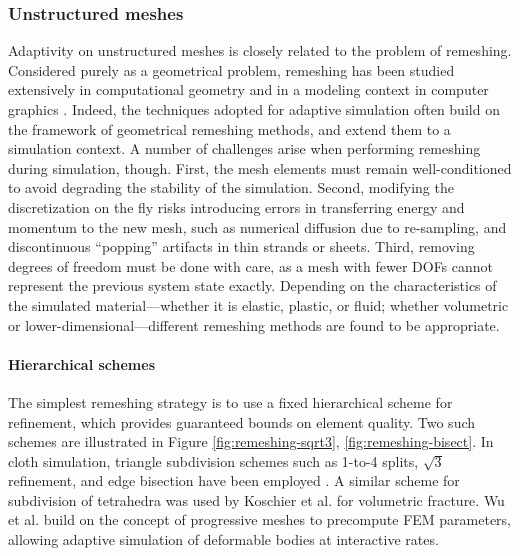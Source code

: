 \subsubsection{Unstructured meshes}
\label{sec:meshes}


Adaptivity on unstructured meshes is closely related to the problem of remeshing.
Considered purely as a geometrical problem, remeshing has been studied extensively in computational geometry \cite{Cheng2012} and in a modeling context in computer graphics \cite{Alliez2008}.
Indeed, the techniques adopted for adaptive simulation often build on the framework of geometrical remeshing methods, and extend them to a simulation context.
A number of challenges arise when performing remeshing during simulation, though.
First, the mesh elements must remain well-conditioned to avoid degrading the stability of the simulation.
Second, modifying the discretization on the fly risks introducing errors in transferring energy and momentum to the new mesh, such as numerical diffusion due to re-sampling, and discontinuous ``popping'' artifacts in thin strands or sheets.
Third, removing degrees of freedom must be done with care, as a mesh with fewer DOFs cannot represent the previous system state exactly.
Depending on the characteristics of the simulated material---whether it is elastic, plastic, or fluid; whether volumetric or lower-dimensional---different remeshing methods are found to be appropriate.


\paragraph*{Hierarchical schemes} The simplest remeshing strategy is to use a fixed hierarchical scheme for refinement, which provides guaranteed bounds on element quality.
Two such schemes are illustrated in Figure \ref{fig:remeshing-sqrt3}, \ref{fig:remeshing-bisect}.
In cloth simulation, triangle subdivision schemes such as 1-to-4 splits, $\sqrt3$ refinement, and edge bisection have been employed \cite{Li2005,Simnett2009,Bender2012:adaptiveFEM}.
A similar scheme for subdivision of tetrahedra was used by Koschier et al. \cite{Koschier2014} for volumetric fracture.
Wu et al. \cite{Wu2001} build on the concept of progressive meshes \cite{Hoppe1996} to precompute FEM parameters, allowing adaptive simulation of deformable bodies at interactive rates.

